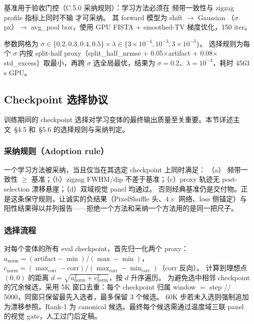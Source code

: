  基准用于验收门控（C.5.0 采纳规则）：学习方法必须在  频带一致性与 zigzag profile 指标上同时不输  才可采纳。
其 forward 模型为 shift \(\rightarrow\) Gaussian （\(\sigma\)  px）\(\rightarrow\) avg\_pool box，使用 GPU FISTA \(+\) smoothed-TV 梯度优化，150 iter。

参数网格为 \(\sigma \in \{0.2, 0.3, 0.4, 0.5\} \times \lambda \in \{3 \times 10^{-4}, 10^{-3}, 3 \times 10^{-3}\}\)。
选择规则为每个 \(\sigma\) 内按 split-half proxy（split\_half\_nrmse \(+\) 0.05\(\times\)artifact \(+\) 0.08\(\times\)std\_excess）取最小，再跨 \(\sigma\) 选全局最优，结果为 \(\sigma = 0.2\)、\(\lambda = 10^{-3}\)，耗时 4563\,s GPU。

\subsection{Checkpoint 选择协议}

训练期间的 checkpoint 选择对学习变体的最终输出质量至关重要。本节详述主文~\S4.5 和~\S5.6 的选择规则与采纳判定。

\subsubsection{采纳规则（Adoption rule）}

一个学习方法被采纳，当且仅当在其选定 checkpoint 上同时满足：
（a） 频带一致性 \(\ge\)  基准；（b）zigzag FWHM/dip 不差于基准；（c）proxy 轨迹无 post-selection 漂移悬崖；（d）双域视觉 panel 均通过。
否则经典基准仍是交付物。正是这条保守规则，让诚实的负结果（PixelShuffle 头、\(4\times\) 网络、loss 侧锚定）与阳性结果得以并列报告——拒绝一个方法和采纳一个方法用的是同一把尺子。

\subsubsection{选择流程}

对每个变体的所有 eval checkpoint，首先归一化两个 proxy：\(a_{\text{norm}} = (\text{artifact} - \min) / (\max - \min)\)，\(c_{\text{norm}} = (\max_{\text{corr}} - \text{corr}) / (\max_{\text{corr}} - \min_{\text{corr}})\)（corr 反向）。
计算到理想点 \((0, 0)\) 的距离 \(d = \sqrt{a_{\text{norm}}^2 + c_{\text{norm}}^2}\)，按 \(d\) 升序遍历。
为避免选中相邻 checkpoint 的冗余候选，采用 5K 窗口去重：每个 checkpoint 归属 window \(=\) step // 5000，同窗只保留最先入选者，最多保留 3 个候选。
60K 步若未入选则强制追加为漂移参照。Rank-1 为 canonical 候选。最终每个候选需通过温度域三联 panel 的视觉 gate，人工过门后定稿。

